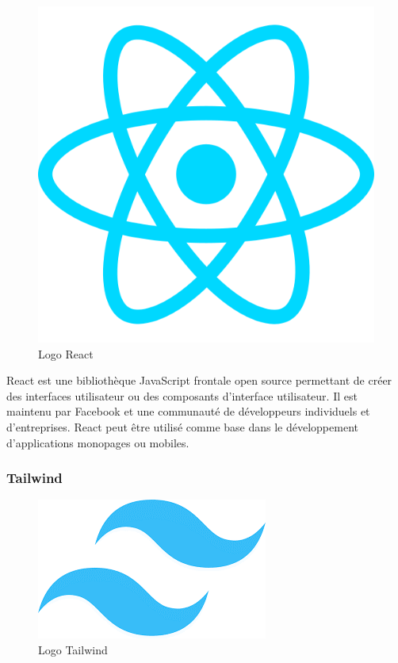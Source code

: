 \begin{figure}[H]
    \centering
    \includegraphics[scale=0.2]{Logos/react.png}
    \caption{Logo React}
\end{figure}

React est une bibliothèque JavaScript frontale open
source permettant de créer des interfaces utilisateur ou des
composants d’interface utilisateur. Il est maintenu par Facebook et une communauté de développeurs individuels et
d’entreprises. React peut être utilisé comme base dans le développement d’applications monopages ou mobiles.

\subsubsection{Tailwind}

\begin{figure}[H]
    \centering
    \includegraphics[scale=0.5]{Logos/tailwind.png}
    \caption{Logo Tailwind}
\end{figure}

